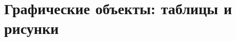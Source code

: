 \documentclass[a4paper,11pt]{book}
\begin{document}


	


%







	\part{Графические объекты: таблицы и рисунки}


	

	

	

	


\end{document}
